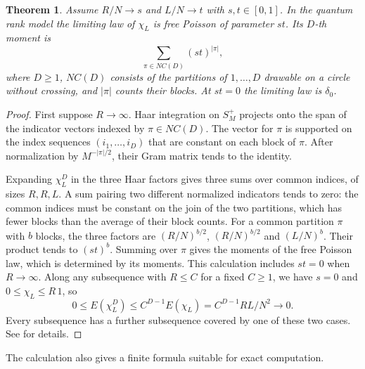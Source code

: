 \documentclass[11pt,a4paper]{article}
\newtheorem{thm}{Theorem}[section]
\begin{document}
\begin{thm}\label{ranklaws}
Assume $R/N\to s$ and $L/N\to t$ with $s,t\in[0,1]$. In the quantum rank model the limiting law of $\chi_L$ is free Poisson of parameter $st$. Its $D$-th moment is
\[
 \sum_{\pi\in NC(D)}(st)^{|\pi|},
\]
where $D\geq1$, $NC(D)$ consists of the partitions of $1,\ldots,D$ drawable on a circle without crossing, and $|\pi|$ counts their blocks. At $st=0$ the limiting law is $\delta_0$.
\end{thm}
\begin{proof}
First suppose $R\to\infty$. Haar integration on $S_M^+$ projects onto the span of the indicator vectors indexed by $\pi\in NC(D)$. The vector for $\pi$ is supported on the index sequences $(i_1,\ldots,i_D)$ that are constant on each block of $\pi$. After normalization by $M^{-|\pi|/2}$, their Gram matrix tends to the identity.

Expanding $\chi_L^D$ in the three Haar factors gives three sums over common indices, of sizes $R,R,L$. A sum pairing two different normalized indicators tends to zero: the common indices must be constant on the join of the two partitions, which has fewer blocks than the average of their block counts. For a common partition $\pi$ with $b$ blocks, the three factors are $(R/N)^{b/2}$, $(R/N)^{b/2}$ and $(L/N)^b$. Their product tends to $(st)^b$. Summing over $\pi$ gives the moments of the free Poisson law, which is determined by its moments. This calculation includes $st=0$ when $R\to\infty$. Along any subsequence with $R\leq C$ for a fixed $C\geq1$, we have $s=0$ and $0\leq\chi_L\leq R\,1$, so
\[
 0\leq E(\chi_L^D)\leq C^{D-1}E(\chi_L)=C^{D-1}RL/N^2\to0 .
\]
Every subsequence has a further subsequence covered by one of these two cases. See \cite{qp} for details.
\end{proof}

The calculation also gives a finite formula suitable for exact computation.
\end{document}
